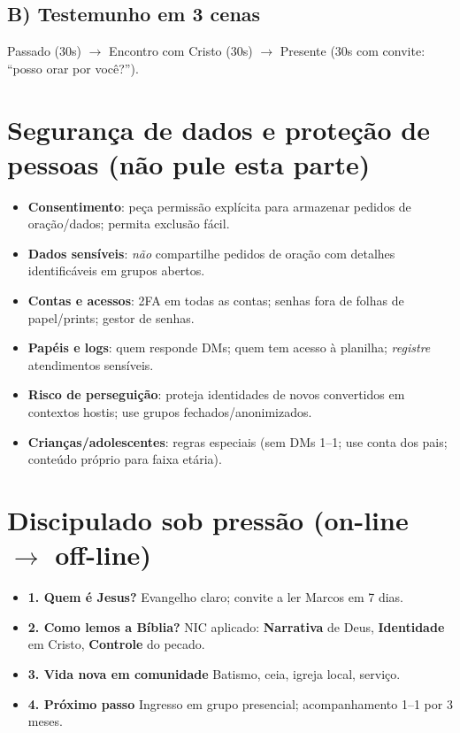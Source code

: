 \subsection*{B) Testemunho em 3 cenas}
Passado (30s) $\rightarrow$ Encontro com Cristo (30s) $\rightarrow$ Presente (30s com convite: “posso orar por você?”).

\section{Segurança de dados e proteção de pessoas (não pule esta parte)}
\begin{checklist}[title={Padrões mínimos para times de evangelismo}]
\begin{itemize}[leftmargin=*,noitemsep]
  \item \textbf{Consentimento}: peça permissão explícita para armazenar pedidos de oração/dados; permita exclusão fácil.
  \item \textbf{Dados sensíveis}: \emph{não} compartilhe pedidos de oração com detalhes identificáveis em grupos abertos.
  \item \textbf{Contas e acessos}: 2FA em todas as contas; senhas fora de folhas de papel/prints; gestor de senhas.
  \item \textbf{Papéis e logs}: quem responde DMs; quem tem acesso à planilha; \emph{registre} atendimentos sensíveis.
  \item \textbf{Risco de perseguição}: proteja identidades de novos convertidos em contextos hostis; use grupos fechados/anonimizados.
  \item \textbf{Crianças/adolescentes}: regras especiais (sem DMs 1–1; use conta dos pais; conteúdo próprio para faixa etária).
\end{itemize}
\end{checklist}

\section{Discipulado sob pressão (on-line $\rightarrow$ off-line)}
\begin{checklist}[title={Caminho em 4 encontros},breakable]
\begin{itemize}[leftmargin=*,noitemsep]
  \item \textbf{1. Quem é Jesus?} Evangelho claro; convite a ler Marcos em 7 dias.
  \item \textbf{2. Como lemos a Bíblia?} NIC aplicado: \textbf{Narrativa} de Deus, \textbf{Identidade} em Cristo, \textbf{Controle} do pecado.
  \item \textbf{3. Vida nova em comunidade} Batismo, ceia, igreja local, serviço.
  \item \textbf{4. Próximo passo} Ingresso em grupo presencial; acompanhamento 1--1 por 3 meses.
\end{itemize}
\end{checklist}

